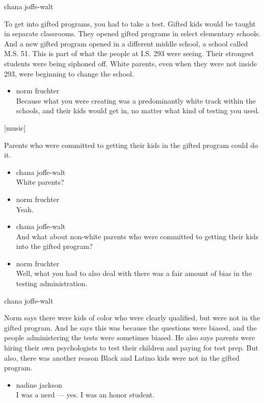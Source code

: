 chana joffe-walt

To get into gifted programs, you had to take a test. Gifted kids would
be taught in separate classrooms. They opened gifted programs in select
elementary schools. And a new gifted program opened in a different
middle school, a school called M.S. 51. This is part of what the people
at I.S. 293 were seeing. Their strongest students were being siphoned
off. White parents, even when they were not inside 293, were beginning
to change the school.

\begin{itemize}
\tightlist
\item
  norm fruchter\\
  Because what you were creating was a predominantly white track within
  the schools, and their kids would get in, no matter what kind of
  testing you used.
\end{itemize}

{[}music{]}

Parents who were committed to getting their kids in the gifted program
could do it.

\begin{itemize}
\item
  chana joffe-walt\\
  White parents?
\item
  norm fruchter\\
  Yeah.
\item
  chana joffe-walt\\
  And what about non-white parents who were committed to getting their
  kids into the gifted program?
\item
  norm fruchter\\
  Well, what you had to also deal with there was a fair amount of bias
  in the testing administration.
\end{itemize}

chana joffe-walt

Norm says there were kids of color who were clearly qualified, but were
not in the gifted program. And he says this was because the questions
were biased, and the people administering the tests were sometimes
biased. He also says parents were hiring their own psychologists to test
their children and paying for test prep. But also, there was another
reason Black and Latino kids were not in the gifted program.

\begin{itemize}
\tightlist
\item
  nadine jackson\\
  I was a nerd --- yes. I was an honor student.
\end{itemize}

